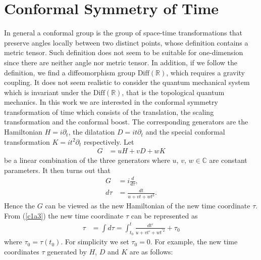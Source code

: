 \documentclass[12pt]{article}
\numberwithin{equation}{section}
\begin{document}
%
%
%
%
%
\section{Conformal Symmetry of Time}
\label{confsec}
In general a conformal group is the 
group of space-time transformations that preserve angles locally between 
two distinct points, whose definition contains a metric tensor. 
Such definition does not seem to be suitable for one-dimension 
since there are neither angle nor metric tensor. 
In addition, if we follow the definition, 
we find a diffeomorphism group $\mathrm{Diff}(\mathbb{R})$, 
which requires a gravity coupling. 
It does not seem realistic to consider the quantum mechanical 
system which is invariant under the $\mathrm{Diff}(\mathbb{R})$, 
that is the topological quantum mechanics. 
In this work we are interested in the conformal symmetry transformation 
of time which consists of the translation, the scaling transformation 
and the conformal boost. 
The corresponding generators are 
the Hamiltonian $H=i\partial_{t}$, 
the dilatation $D=it\partial_{t}$ 
and the special conformal transformation $K=it^{2}\partial_{t}$ 
respectively. 
Let 
\begin{align}
\label{c1a1}
G&=uH+vD+wK
\end{align}
be a linear combination of the three generators 
where $u$, $v$, $w \in \mathbb{C}$ are constant parameters. 
It then turns out that 
\begin{align}
\label{c1a2}
G&=i\frac{d}{d\tau}, \\
\label{c1a3}
d\tau&=\frac{dt}{u+vt+wt^{2}}. 
\end{align}
Hence the $G$ can be viewed as the new Hamiltonian of the new time coordinate $\tau$. 
From (\ref{c1a3}) the new time coordinate $\tau$ can be represented as 
\begin{align}
\label{c1a4}
\tau&=\int d\tau
=\int_{t_{0}}^{t}\frac{dt'}
{u+vt'+wt^{'2}}+\tau_{0}
\end{align}
where $\tau_{0}=\tau(t_{0})$. 
For simplicity we set $\tau_{0}=0$. 
For example, 
the new time coordinates $\tau$ generated by 
$H$, $D$ and $K$ are as follows:
%
%
%
\end{document}

